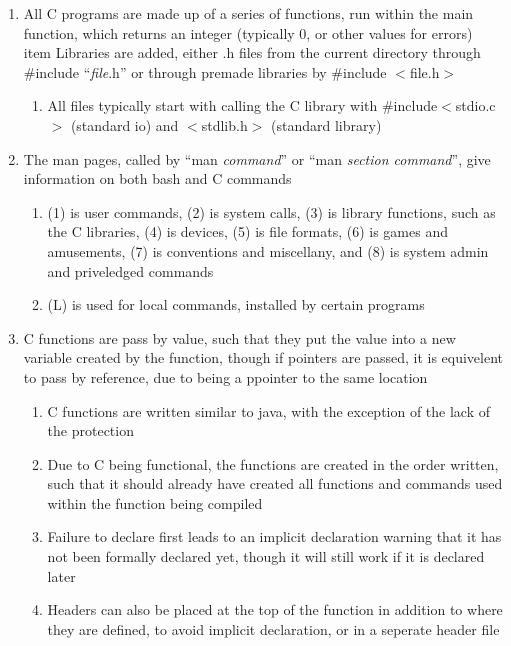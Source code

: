 \documentclass[11 pt, twoside]{article}
\begin{document}
\begin{enumerate}
\item All C programs are made up of a series of functions, run within the main function, which returns an integer (typically 0, or other values for errors)
item Libraries are added, either .h files from the current directory through \#include ``\textit{file}.h'' or through premade libraries by \#include $<$file.h$>$
\begin{enumerate}
\item All files typically start with calling the C library with \#include$<$stdio.c$>$ (standard io) and $<$stdlib.h$>$ (standard library)
\end{enumerate}
\item The man pages, called by ``man \textit{command}'' or ``man \textit{section command}'', give information on both bash and C commands
\begin{enumerate}
\item (1) is user commands, (2) is system calls, (3) is library functions, such as the C libraries, (4) is devices, (5) is file formats, (6) is games and amusements, (7) is conventions and miscellany, and (8) is system admin and priveledged commands
\item (L) is used for local commands, installed by certain programs
\end{enumerate}
\item C functions are pass by value, such that they put the value into a new variable created by the function, though if pointers are passed, it is equivelent to pass by reference, due to being a ppointer to the same location
\begin{enumerate}
\item C functions are written similar to java, with the exception of the lack of the protection
\item Due to C being functional, the functions are created in the order written, such that it should already have created all functions and commands used within the function being compiled
\item Failure to declare first leads to an implicit declaration warning that it has not been formally declared yet, though it will still work if it is declared later
\item Headers can also be placed at the top of the function in addition to where they are defined, to avoid implicit declaration, or in a seperate header file
\end{enumerate}
\end{enumerate}
\end{document}
